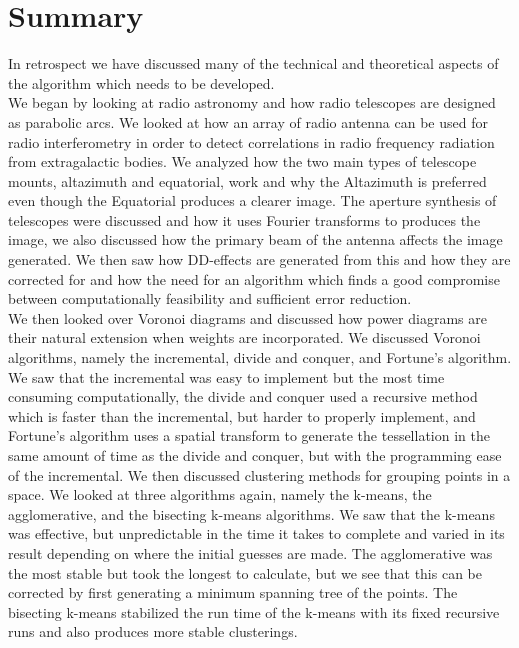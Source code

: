\section{Summary}\label{sum}
In retrospect we have discussed many of the technical and theoretical aspects of the algorithm which needs to be developed.
\\
We began by looking at radio astronomy and how radio telescopes are designed as parabolic arcs. We looked at how an array of radio antenna can be used for radio interferometry in order to detect correlations in radio frequency radiation from extragalactic bodies. We analyzed how the two main types of telescope mounts, altazimuth and equatorial, work and why the Altazimuth is preferred even though the Equatorial produces a clearer image. The aperture synthesis of telescopes were discussed and how it uses Fourier transforms to produces the image, we also discussed how the primary beam of the antenna affects the image generated. We then saw how DD-effects are generated from this and how they are corrected for and how the need for an algorithm which finds a good compromise between computationally feasibility and sufficient error reduction.
\\
We then looked over Voronoi diagrams and discussed how power diagrams are their natural extension when weights are incorporated. We discussed Voronoi algorithms, namely the incremental, divide and conquer, and Fortune's algorithm. We saw that the incremental was easy to implement but the most time consuming computationally, the divide and conquer used a recursive method which is faster than the incremental, but harder to properly implement, and Fortune's algorithm uses a spatial transform to generate the tessellation in the same amount of time as the divide and conquer, but with the programming ease of the incremental. We then discussed clustering methods for grouping points in a space. We looked at three algorithms again, namely the k-means, the agglomerative, and the bisecting k-means algorithms. We saw that the k-means was effective, but unpredictable in the time it takes to complete and varied in its result depending on where the initial guesses are made. The agglomerative was the most stable but took the longest to calculate, but we see that this can be corrected by first generating a minimum spanning tree of the points. The bisecting k-means stabilized the run time of the k-means with its fixed recursive runs and also produces more stable clusterings.
\\
